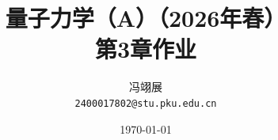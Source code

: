 \title{\textbf{量子力学（A）（2026年春）} \\[0.5em]
    \Large 第3章作业}
\author{冯翊展 \\ 
    \normalsize{\texttt{2400017802@stu.pku.edu.cn}}}
\date{\today}